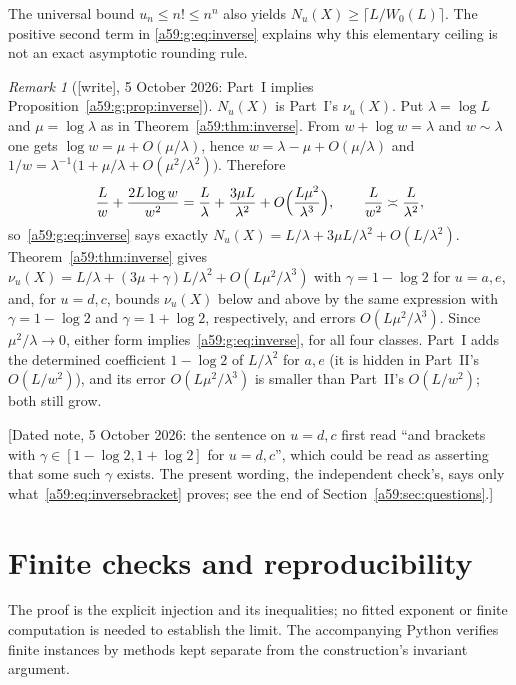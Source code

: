 \documentclass[11pt,letterpaper]{article}
\theoremstyle{remark}\newtheorem{remark}[theorem]{Remark}
\newcommand{\wtag}{\textup{[write]}}
\theoremstyle{remark}\newtheorem{wremark}{Remark}\renewcommand{\thewremark}{W\arabic{wremark}}
\theoremstyle{plain}\newtheorem{wcorollary}[wremark]{Corollary}
\begin{document}
The universal bound $u_n\leq n!\leq n^n$ also yields
$N_u(X)\geq\lceil L/W_0(L)\rceil$. The positive second term in \eqref{a59:g:eq:inverse} explains why this elementary ceiling is not an exact asymptotic rounding rule.

\begin{wremark}[\wtag, 5 October 2026: Part~I implies Proposition~\ref{a59:g:prop:inverse}]\label{a59:g:rem:inverseimplied}
$N_u(X)$ is Part~I's $\nu_u(X)$. Put $\lambda=\log L$ and $\mu=\log\lambda$
as in Theorem~\ref{a59:thm:inverse}. From $w+\log w=\lambda$ and $w\sim\lambda$
one gets $\log w=\mu+O(\mu/\lambda)$, hence $w=\lambda-\mu+O(\mu/\lambda)$
and $1/w=\lambda^{-1}\bigl(1+\mu/\lambda+O(\mu^2/\lambda^2)\bigr)$. Therefore
\[
 \frac Lw+\frac{2L\log w}{w^2}
 =\frac L\lambda+\frac{3\mu L}{\lambda^2}+O\Bigl(\frac{L\mu^2}{\lambda^3}\Bigr),
 \qquad\frac L{w^2}\asymp\frac L{\lambda^2},
\]
so~\eqref{a59:g:eq:inverse} says exactly
$N_u(X)=L/\lambda+3\mu L/\lambda^2+O(L/\lambda^2)$. Theorem~\ref{a59:thm:inverse}
gives $\nu_u(X)=L/\lambda+(3\mu+\gamma)L/\lambda^2+O(L\mu^2/\lambda^3)$ with
$\gamma=1-\log2$ for $u=a,e$, and, for $u=d,c$, bounds $\nu_u(X)$ below
and above by the same expression with $\gamma=1-\log2$ and
$\gamma=1+\log2$, respectively, and errors $O(L\mu^2/\lambda^3)$. Since $\mu^2/\lambda\to0$, either
form implies~\eqref{a59:g:eq:inverse}, for all four classes. Part~I adds the
determined coefficient $1-\log2$ of $L/\lambda^2$ for $a,e$ (it is hidden
in Part~II's $O(L/w^2)$), and its error $O(L\mu^2/\lambda^3)$ is smaller
than Part~II's $O(L/w^2)$; both still grow.

[Dated note, 5 October 2026: the sentence on $u=d,c$ first read ``and
brackets with $\gamma\in[1-\log2,1+\log2]$ for $u=d,c$'', which could be read
as asserting that some such $\gamma$ exists. The present wording, the
independent check's, says only what~\eqref{a59:eq:inversebracket} proves;
see the end of Section~\ref{a59:sec:questions}.]
\end{wremark}
\section{Finite checks and reproducibility}\label{a59:g:sec:checks}
The proof is the explicit injection and its inequalities; no fitted exponent or finite computation is needed to establish the limit. The accompanying Python verifies finite instances by methods kept separate from the construction's invariant argument.
\end{document}
